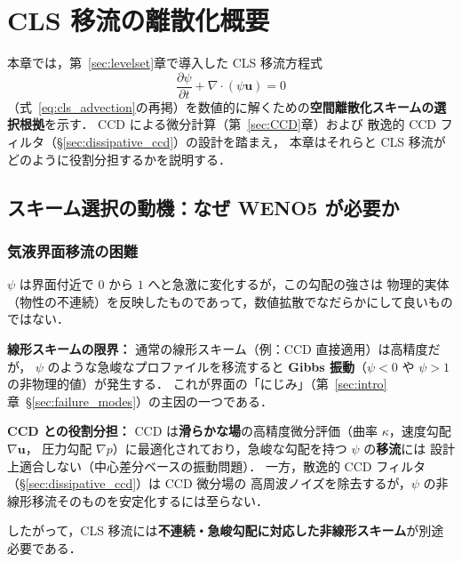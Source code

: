 %
%
\section{CLS 移流の離散化概要}
\label{sec:time}

本章では，第~\ref{sec:levelset}章で導入した CLS 移流方程式
\begin{equation}
  \frac{\partial\psi}{\partial t} + \nabla\cdot(\psi\bm{u}) = 0
  \label{eq:cls_advection_ref}
\end{equation}
（式~\eqref{eq:cls_advection}の再掲）を数値的に解くための\textbf{空間離散化スキームの選択根拠}を示す．
CCD による微分計算（第~\ref{sec:CCD}章）および
散逸的 CCD フィルタ（§\ref{sec:dissipative_ccd}）の設計を踏まえ，
本章はそれらと CLS 移流がどのように役割分担するかを説明する．

\subsection{スキーム選択の動機：なぜ WENO5 が必要か}
\label{sec:advection_motivation}

\subsubsection{気液界面移流の困難}

$\psi$ は界面付近で $0$ から $1$ へと急激に変化するが，この勾配の強さは
物理的実体（物性の不連続）を反映したものであって，数値拡散でなだらかにして良いものではない．

\textbf{線形スキームの限界：}
通常の線形スキーム（例：CCD 直接適用）は高精度だが，
$\psi$ のような急峻なプロファイルを移流すると
\textbf{Gibbs 振動}（$\psi < 0$ や $\psi > 1$ の非物理的値）が発生する．
これが界面の「にじみ」（第~\ref{sec:intro}章~§\ref{sec:failure_modes}）の主因の一つである．

\textbf{CCD との役割分担：}
CCD は\textbf{滑らかな場}の高精度微分評価（曲率 $\kappa$，速度勾配 $\nabla\bm{u}$，
圧力勾配 $\nabla p$）に最適化されており，急峻な勾配を持つ $\psi$ の\textbf{移流}には
設計上適合しない（中心差分ベースの振動問題）．
一方，散逸的 CCD フィルタ（§\ref{sec:dissipative_ccd}）は CCD 微分場の
高周波ノイズを除去するが，$\psi$ の非線形移流そのものを安定化するには至らない．

したがって，CLS 移流には\textbf{不連続・急峻勾配に対応した非線形スキーム}が別途必要である．

